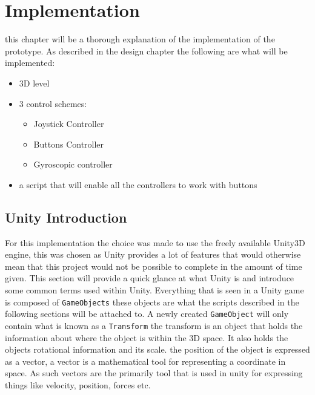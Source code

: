 \chapter{Implementation}
this chapter will be a thorough explanation of the implementation of the prototype.
As described in the design chapter the following are what will be implemented:
\begin{itemize}
\item 3D level
\item 3 control schemes:
		\begin{itemize}
		\item Joystick Controller
		\item Buttons Controller
		\item Gyroscopic controller 
		\end{itemize}
\item a script that will enable all the controllers to work with buttons
\end{itemize}

\section{Unity Introduction}
For this implementation the choice was made to use the freely available Unity3D engine, this was chosen as Unity provides a lot of features that would otherwise mean that this project would not be possible to complete in the amount of time given. This section will provide a quick glance at what Unity is and introduce some common terms used within Unity. Everything that is seen in a Unity game is composed of {\tt GameObjects} these objects are what the scripts described in the following sections will be attached to. A newly created {\tt GameObject} will only contain what is known as a {\tt Transform} the transform is an object that holds the information about where the object is within the 3D space. It also holds the objects rotational information  and its scale.
the position of the object is expressed as a vector, a vector is a mathematical tool for representing a coordinate in space. As such vectors are the primarily tool that is used in unity for expressing things like velocity, position, forces etc.
